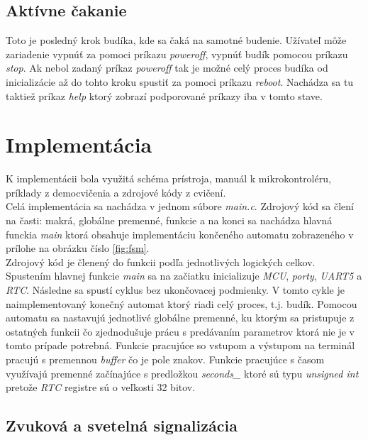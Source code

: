 \documentclass[11pt,a4paper]{article}
\begin{document}
        \subsection{Aktívne čakanie}

            \indent Toto je posledný krok budíka, kde sa čaká na samotné budenie. Užívateľ môže zariadenie vypnúť za pomoci príkazu \textit{poweroff}, vypnúť budík pomocou príkazu \textit{stop}. Ak nebol zadaný príkaz \textit{poweroff} tak je možné celý proces budíka od inicializácie až do tohto kroku spustiť za pomoci príkazu \textit{reboot}. Nachádza sa tu taktiež príkaz \textit{help} ktorý zobrazí podporované príkazy iba v tomto stave.


\section{Implementácia}

    \indent K implementácii bola využitá schéma prístroja\cite{SCHEME}, manuál k mikrokontroléru\cite{MANUAL}, príklady z democvičenia a zdrojové kódy z cvičení.\\

    \indent Celá implementácia sa nachádza v jednom súbore \textit{main.c}. Zdrojový kód sa člení na časti: makrá, globálne premenné, funkcie a na konci sa nachádza hlavná funckia \textit{main} ktorá obsahuje implementáciu končeného automatu zobrazeného v prílohe na obrázku číslo \ref{fig:fsm}.\\

    \indent Zdrojový kód je členený do funkcii podľa jednotlivých logických celkov. Spustením hlavnej funkcie \textit{main} sa na začiatku inicializuje \textit{MCU}, \textit{porty}, \textit{UART5} a \textit{RTC}. Následne sa spustí cyklus bez ukončovacej podmienky. V tomto cykle je naimplementovaný konečný automat ktorý riadi celý proces, t.j. budík. Pomocou automatu sa nastavujú jednotlivé globálne premenné, ku ktorým sa pristupuje z ostatných funkcii čo zjednodušuje prácu s predávaním parametrov ktorá nie je v tomto prípade potrebná. Funkcie pracujúce so vstupom a výstupom na terminál pracujú s premennou \textit{buffer} čo je pole znakov. Funkcie pracujúce s časom využívajú premenné začínajúce s predložkou \textit{seconds\_} ktoré sú typu \textit{unsigned int} pretože \textit{RTC} registre sú o veľkosti 32 bitov.

    \subsection{Zvuková a svetelná signalizácia}
\end{document}
